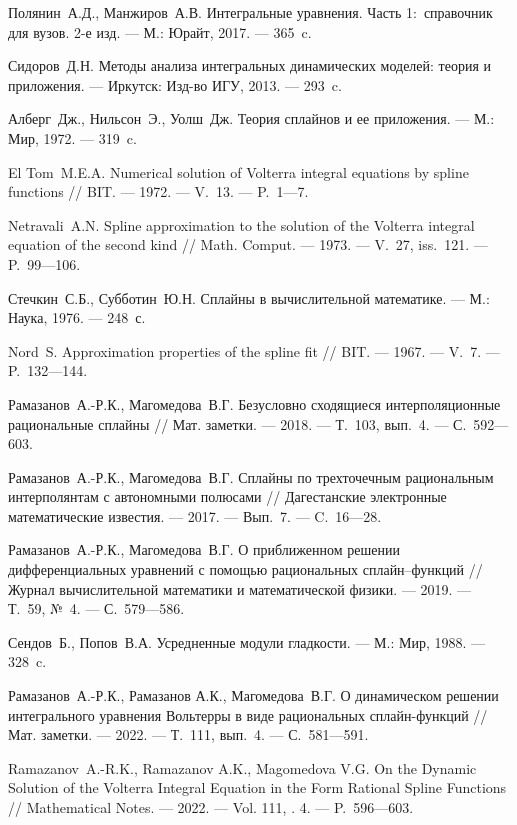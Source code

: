 \begin{thebibliography}{111}
Полянин~А.Д., Манжиров~А.В.
Интегральные уравнения. Часть 1:~справочник для вузов. 2-е изд.
--- М.: Юрайт, 2017.
--- 365~c.

Сидоров~Д.Н.
Методы анализа интегральных динамических моделей: теория и приложения. 
--- Иркутск: Изд-во ИГУ, 2013.
--- 293~c.

Алберг~Дж., Нильсон~Э., Уолш~Дж.
Теория сплайнов и ее приложения.
--- М.: Мир, 1972.
--- 319~c.

El Tom~M.E.A.
Numerical solution of Volterra integral equations by spline functions
//
BIT. 
--- 1972.
--- V.~13.
--- P.~1---7.

Netravali~A.N.
Spline approximation to the solution of the Volterra integral equation of the second kind
//
Math. Comput.
--- 1973.
--- V.~27, iss.~121.
--- P.~99---106.

Стечкин~С.Б., Субботин~Ю.Н.
Сплайны в вычислительной математике.
--- М.: Наука, 1976.
--- 248~с.

Nord~S.
Approximation properties of the spline fit
//
BIT.
--- 1967.
--- V.~7.
--- P.~132---144.

Рамазанов~А.-Р.К., Магомедова~В.Г.
Безусловно сходящиеся
интерполяционные рациональные сплайны
//
Мат. заметки.
--- 2018.
--- Т.~103, вып.~4.
--- С.~592---603.

Рамазанов~А.-Р.К., Магомедова~В.Г.
Сплайны по трехточечным рациональным интерполянтам с автономными полюсами
//
Дагестанские электронные математические известия.
--- 2017.
--- Вып.~7.
--- C.~16---28.

Рамазанов~А.-Р.К., Магомедова~В.Г.
О приближенном решении дифференциальных уравнений с помощью рациональных сплайн--функций
//
Журнал вычислительной математики и математической физики.
--- 2019.
--- Т.~59, №~4.
--- С.~579---586.

Сендов~Б., Попов~В.А.
Усредненные модули гладкости.
--- М.: Мир, 1988.
--- 328~c.

Рамазанов~А.-Р.К., Рамазанов А.К., Магомедова~В.Г.
О динамическом решении интегрального уравнения Вольтерры в виде рациональных сплайн-функций
//
Мат. заметки.
--- 2022.
--- Т.~111, вып.~4.
--- С.~581---591.

Ramazanov~A.-R.K., Ramazanov A.K., Magomedova V.G.
On the Dynamic Solution of the Volterra Integral Equation in the Form Rational Spline Functions
//
Mathematical Notes.
--- 2022.
--- Vol. 111, \No. 4.
--- P.~596---603.


\end{thebibliography}
